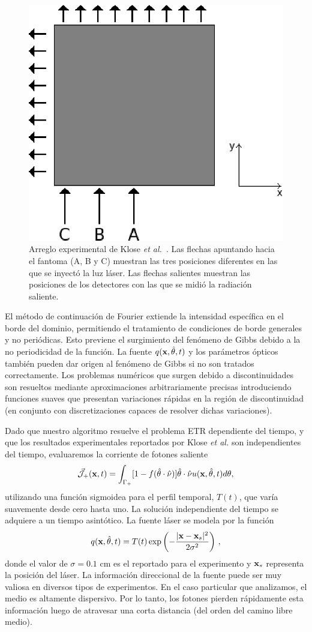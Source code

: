 \begin{figure}[h!]
\centering
  \includegraphics[width=0.4\linewidth]{figuras/phantom.eps}
   \caption{Arreglo experimental de Klose \textit{et al.}~\cite{Klose2002}. 
   Las flechas apuntando hacia el fantoma (A, B y C)  
   muestran las tres posiciones diferentes en las que se inyectó 
   la luz láser. Las flechas salientes muestran las posiciones de los detectores 
   con las que se midió la radiación saliente.}
 \label{fig:phantom}
\end{figure}

El método de continuación de Fourier extiende 
la intensidad específica en el borde del dominio, 
permitiendo el tratamiento de condiciones de borde generales y no periódicas.  
Esto previene el surgimiento del fenómeno de Gibbs debido a la no periodicidad 
de la función. La fuente $q(\mathbf{x},\hat{\theta},t)$ y los parámetros ópticos 
también pueden dar origen al fenómeno de Gibbs si no son 
tratados correctamente. Los problemas numéricos que surgen 
debido a discontinuidades son resueltos mediante aproximaciones arbitrariamente precisas 
introduciendo funciones suaves que presentan 
variaciones rápidas en la región de discontinuidad (en conjunto 
con discretizaciones capaces de resolver dichas variaciones).

Dado que nuestro algoritmo resuelve el problema ETR dependiente del tiempo, 
y que los resultados experimentales reportados por Klose \textit{et al.} 
son independientes del tiempo, evaluaremos la corriente de fotones saliente 
\begin{equation}
 \vec{ \mathcal{J}}_+(\mathbf{x},t)=\int_{\Gamma_+} [1-f(\hat{\theta} \cdot \hat{\nu})] \hat{\theta} \cdot \hat{\nu} u(\mathbf{x},\hat{\theta},t) d\theta,
\label{eq:photoncurrentsal}
\end{equation}
utilizando una función sigmoidea para el perfil temporal, $T(t)$, 
que varía suavemente desde cero 
hasta uno. La solución independiente del tiempo 
se adquiere a un tiempo asintótico.
La fuente láser se modela por la función
\begin{equation}
q(\mathbf{x},\hat{\theta},t)=T(t)\exp \left(  -\frac{|\mathbf{x}-\mathbf{x}_s|^2}{2\sigma^2} \right)  \, ,
\label{eq:sourceGauss}
\end{equation}
donde el valor de $\sigma=0.1$ cm es el reportado para el experimento y $\mathbf{x}_s$ 
representa la posición del láser. La información direccional de la fuente 
puede ser muy valiosa en diversos tipos de experimentos. 
En el caso particular que analizamos, el medio es altamente dispersivo. Por lo tanto, los 
fotones pierden rápidamente esta información 
luego de atravesar una corta distancia (del orden del camino libre medio).

